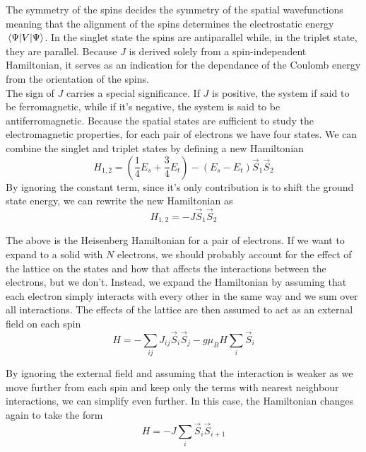 \documentclass[../main.tex]{subfiles}
\begin{document}
The symmetry of the spins decides the symmetry of the spatial wavefunctions meaning that the alignment of the spins determines the electrostatic energy $\expval{V}{\Psi}$. In the singlet state the spins are antiparallel while, in the triplet state, they are parallel. Because $J$ is derived solely from a spin-independent Hamiltonian, it serves as an indication for the dependance of the Coulomb energy from the orientation of the spins.\\

The sign of $J$ carries a special significance. If $J$ is positive, the system if said to be ferromagnetic, while if it's negative, the system is said to be antiferromagnetic. Because the spatial states are sufficient to study the electromagnetic properties, for each pair of electrons we have four states. We can combine the singlet and triplet states by defining a new Hamiltonian
\begin{equation}
    H_{1,2}=\left(\frac{1}{4}E_{s}+\frac{3}{4}E_{t}\right)-(E_{s}-E_{t})\vec{S}_{1}\vec{S}_{2}
\end{equation}
By ignoring the constant term, since it's only contribution is to shift the ground state energy, we can rewrite the new Hamiltonian as
\begin{equation}
    H_{1,2}=-J\vec{S}_{1}\vec{S}_{2}
\end{equation}

The above is the Heisenberg Hamiltonian for a pair of electrons. If we want to expand to a solid with $N$ electrons, we should probably account for the effect of the lattice on the states and how that affects the interactions between the electrons, but we don't. Instead, we expand the Hamiltonian by assuming that each electron simply interacts with every other in the same way and we sum over all interactions. The effects of the lattice are then assumed to act as an external field on each spin
\begin{equation}
    H=-\sum_{ij} J_{ij}\vec{S}_{i}\vec{S}_{j} -g\mu_{B}H\sum_{i}\vec{S}_{i}
\end{equation}

By ignoring the external field and assuming that the interaction is weaker as we move further from each spin and keep only the terms with nearest neighbour interactions, we can simplify even further. In this case, the Hamiltonian changes again to take the form
\begin{equation}
    H=-J\sum_{i}\vec{S}_{i}\vec{S}_{i+1}
\end{equation}
\end{document}
